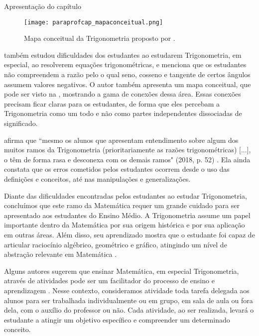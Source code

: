 \begin{apresentacao}{Apresentação do capítulo}
\begin{figure}[H]
    \centering
    \texttt{[image: paraprofcap\_mapaconceitual.png]}
    \caption{Mapa conceitual da Trigonometria proposto por \citet{chigonga2016}.}
    \label{paraoprofcap_mapaconceitual}
\end{figure}
\citet{chigonga2016} também estudou dificuldades dos estudantes ao estudarem Trigonometria, em especial, ao resolverem equações trigonométricas, e menciona que os estudantes não compreendem a razão pelo o qual seno, cosseno e tangente de certos ângulos assumem valores negativos. 
%
O autor também apresenta um mapa conceitual, que pode ser visto na , mostrando a gama de conexões dessa área. Essas conexões precisam ficar claras para os estudantes, de forma que eles percebam a Trigonometria como um todo e não como partes independentes dissociadas de significado.

\citeauthor{feijo2018} afirma que ``mesmo os alunos que apresentam entendimento sobre algum dos muitos ramos da Trigonometria (prioritariamente as razões trigonométricas) [...], o têm de forma rasa e desconexa com os demais ramos"  \citep[p. 52]{feijo2018}(2018, p. 52) . 
% 
Ela ainda constata que os erros cometidos pelos estudantes ocorrem desde o uso das definições e conceitos, até nas manipulações e generalizações.

Diante das dificuldades encontradas pelos estudantes ao estudar Trigonometria, concluímos que este ramo da Matemática requer um grande cuidado para ser apresentado aos estudantes do Ensino Médio.
%
A Trigonometria assume um papel importante dentro da Matemática por sua origem histórica e por sua aplicação em outras áreas.
%
Além disso, seu aprendizado mostra que o estudante foi capaz de articular raciocínio algébrico, geométrico e gráfico, atingindo um nível de abstração relevante em Matemática \citep{weber2005}. 

Alguns autores sugerem que ensinar Matemática, em especial Trigonometria, através de atividades pode ser um facilitador do processo de ensino e aprendizagem \citep{costa1997, mendes2001, silva2011}. 
%
Nesse contexto, consideramos atividade toda tarefa delegada aos alunos para ser trabalhada individualmente ou em grupo, em sala de aula ou fora dela, com o auxílio do professor ou não.
%
Cada atividade, ao ser realizada, levará o estudante a atingir um objetivo específico e compreender um determinado conceito.


\end{apresentacao}
